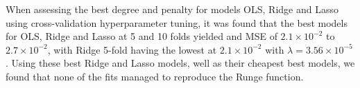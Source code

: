 \documentclass[reprint,english,notitlepage]{revtex4-2}  %
\begin{document}
When assessing the best degree and penalty for models OLS, Ridge and Lasso using cross-validation hyperparameter tuning, it was found that the best models for OLS, Ridge and Lasso at 5 and 10 folds yielded and MSE of $2.1\times10^{-2}$ to $2.7\times10^{-2}$, with Ridge 5-fold having the lowest at $2.1\times10^{-2}$ with $\lambda=3.56\times10^{-5}$. Using these best Ridge and Lasso models, well as their cheapest best models, we found that none of the fits managed to reproduce the Runge function.

\onecolumngrid















\end{document}
